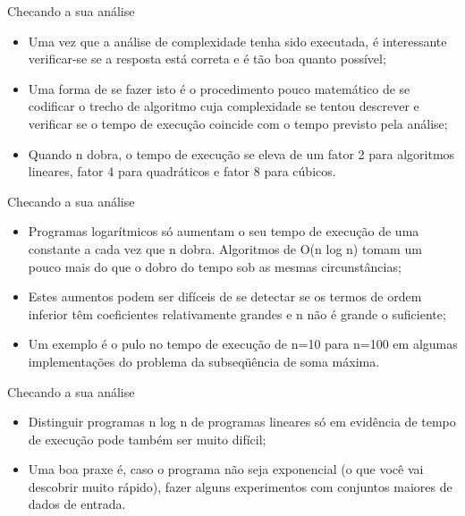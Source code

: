 \documentclass[12pt,table,xcolor={dvipsnames}]{beamer}
\begin{document}
\begin{frame}[fragile]{Checando a sua análise}
\begin{itemize}
\item Uma vez que a análise de complexidade tenha sido executada, é interessante verificar-se se a resposta está correta e é tão boa quanto possível;
\item Uma forma de se fazer isto é o procedimento pouco matemático de se codificar o trecho de algoritmo cuja complexidade se tentou descrever e verificar se o tempo de execução coincide com o tempo previsto pela análise;
\item Quando n dobra, o tempo de execução se eleva de um fator 2 para algoritmos lineares, fator 4 para quadráticos e fator 8 para cúbicos.
\end{itemize}
\end{frame}

\begin{frame}[fragile]{Checando a sua análise}
\begin{itemize}
\item Programas logarítmicos só aumentam o seu tempo de execução de uma constante a cada vez que n dobra. Algoritmos de O(n log n) tomam um pouco mais do que o dobro do tempo sob as mesmas circunstâncias;
\item Estes aumentos podem ser difíceis de se detectar se os termos de ordem inferior têm coeficientes relativamente grandes e n não é grande o suficiente;
\item Um exemplo é o pulo no tempo de execução de n=10 para n=100 em algumas implementações do problema da subseqüência de soma máxima.
\end{itemize}
\end{frame}

\begin{frame}[fragile]{Checando a sua análise}
\begin{itemize}
\item Distinguir programas n log n de programas lineares só em evidência de tempo de execução pode também ser muito difícil;
\item Uma boa praxe é, caso o programa não seja exponencial (o que você vai descobrir muito rápido), fazer alguns experimentos com conjuntos maiores de dados de entrada.
\end{itemize}
\end{frame}
\end{document}
